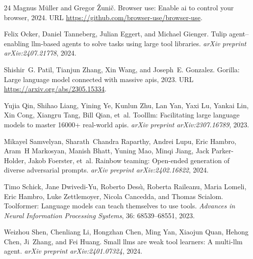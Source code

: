 \begin{thebibliography}{24}
Magnus Müller and Gregor Žunič.
\newblock Browser use: Enable ai to control your browser, 2024.
\newblock URL \url{https://github.com/browser-use/browser-use}.

Felix Ocker, Daniel Tanneberg, Julian Eggert, and Michael Gienger.
\newblock Tulip agent--enabling llm-based agents to solve tasks using large tool libraries.
\newblock \emph{arXiv preprint arXiv:2407.21778}, 2024.

Shishir~G. Patil, Tianjun Zhang, Xin Wang, and Joseph~E. Gonzalez.
\newblock Gorilla: Large language model connected with massive apis, 2023.
\newblock URL \url{https://arxiv.org/abs/2305.15334}.

Yujia Qin, Shihao Liang, Yining Ye, Kunlun Zhu, Lan Yan, Yaxi Lu, Yankai Lin, Xin Cong, Xiangru Tang, Bill Qian, et~al.
\newblock Toolllm: Facilitating large language models to master 16000+ real-world apis.
\newblock \emph{arXiv preprint arXiv:2307.16789}, 2023.

Mikayel Samvelyan, Sharath~Chandra Raparthy, Andrei Lupu, Eric Hambro, Aram~H Markosyan, Manish Bhatt, Yuning Mao, Minqi Jiang, Jack Parker-Holder, Jakob Foerster, et~al.
\newblock Rainbow teaming: Open-ended generation of diverse adversarial prompts.
\newblock \emph{arXiv preprint arXiv:2402.16822}, 2024.

Timo Schick, Jane Dwivedi-Yu, Roberto Dess{\`\i}, Roberta Raileanu, Maria Lomeli, Eric Hambro, Luke Zettlemoyer, Nicola Cancedda, and Thomas Scialom.
\newblock Toolformer: Language models can teach themselves to use tools.
\newblock \emph{Advances in Neural Information Processing Systems}, 36: 68539--68551, 2023.

Weizhou Shen, Chenliang Li, Hongzhan Chen, Ming Yan, Xiaojun Quan, Hehong Chen, Ji~Zhang, and Fei Huang.
\newblock Small llms are weak tool learners: A multi-llm agent.
\newblock \emph{arXiv preprint arXiv:2401.07324}, 2024.


\end{thebibliography}
